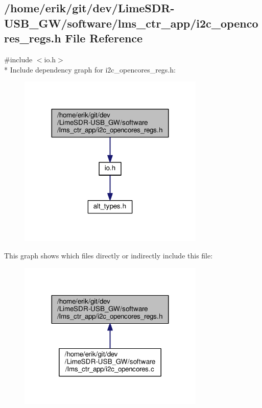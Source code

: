 \subsection{/home/erik/git/dev/\+Lime\+S\+D\+R-\/\+U\+S\+B\+\_\+\+G\+W/software/lms\+\_\+ctr\+\_\+app/i2c\+\_\+opencores\+\_\+regs.h File Reference}
\label{software_2lms__ctr__app_2i2c__opencores__regs_8h}
{\ttfamily \#include $<$io.\+h$>$}\\*
Include dependency graph for i2c\+\_\+opencores\+\_\+regs.\+h\+:
\nopagebreak
\begin{figure}[H]
\begin{center}
\leavevmode
\includegraphics[width=251pt]{d6/d3d/software_2lms__ctr__app_2i2c__opencores__regs_8h__incl}
\end{center}
\end{figure}
This graph shows which files directly or indirectly include this file\+:
\nopagebreak
\begin{figure}[H]
\begin{center}
\leavevmode
\includegraphics[width=251pt]{dc/d79/software_2lms__ctr__app_2i2c__opencores__regs_8h__dep__incl}
\end{center}
\end{figure}
